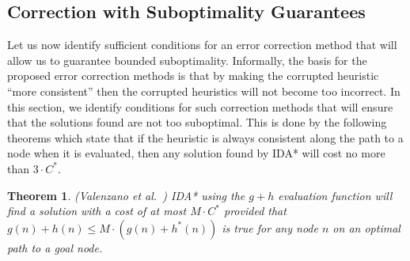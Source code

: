 \documentclass{article}
\newtheorem{theorem}{Theorem}
\newtheorem{definition}{Definition}
\begin{document}


\subsection{Correction with Suboptimality Guarantees}

Let us now identify sufficient conditions for an error correction method that will allow us to guarantee bounded suboptimality.
Informally, the basis for the proposed error correction methods is that by making the corrupted heuristic ``more consistent'' then the corrupted heuristics will not become too incorrect.
In this section, we identify conditions for such correction methods that will ensure that the solutions found are not too suboptimal.
This is done by the following theorems which state that if the heuristic is always consistent along the path to a node when it is evaluated, then any solution found by IDA* will cost no more than $3 \cdot C^*$. 


\begin{theorem} (Valenzano et al.~)
IDA* using the $g+h$ evaluation function will find a solution with a cost of at most $M\cdot C^*$ provided that $g(n) + h(n) \leq M \cdot (g(n)+h^*(n))$ is true for any node $n$ on an optimal path to a goal node. %
\label{theorem:rickmas}
\end{theorem}
\end{document}
